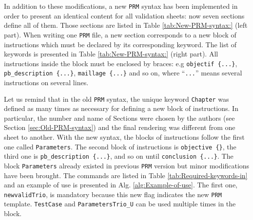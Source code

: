 In addition to these modifications, a new \texttt{PRM} syntax has
been implemented in order to present an identical content for all
validation sheets: now seven sections define all of them. Those sections
are listed in Table \ref{tab:New-PRM-syntax:} (left part). When writing
one \texttt{PRM} file, a new section corresponds to a new block of
instructions which must be declared by its corresponding keyword.
The list of keywords is presented in Table \ref{tab:New-PRM-syntax:}
(right part). All instructions inside the block must be enclosed by
braces: e.g \texttt{objectif \{...\}}, \texttt{pb\_description \{...\}},
\texttt{maillage \{...\}} and so on, where ``\texttt{...}'' means
several instructions on several lines.

Let us remind that in the old \texttt{PRM} syntax, the unique keyword
\texttt{Chapter} was defined as many times as necessary for defining
a new block of instructions. In particular, the number and name of
Sections were chosen by the authors (see Section \ref{sec:Old-PRM-syntax})
and the final rendering was different from one sheet to another.
With the new syntax, the blocks of instructions follow the first one
called \texttt{Parameters}. The second block of instructions is \texttt{objective
\{\}}, the third one is \texttt{pb\_description \{...\}}, and so on
until \texttt{conclusion \{...\}}. The block \texttt{Parameters} 
already existed in previous \texttt{PRM} version but minor modifications
have been brought. The commands are listed in Table \ref{tab:Required-keywords-in}
and an example of use is presented in Alg. \ref{alg:Example-of-use}.
The first one, \texttt{newvalidTrio}, is mandatory because this new
flag indicates the new \texttt{PRM} template. \texttt{TestCase} and
\texttt{ParametersTrio\_U} can be used multiple times in the block. 

